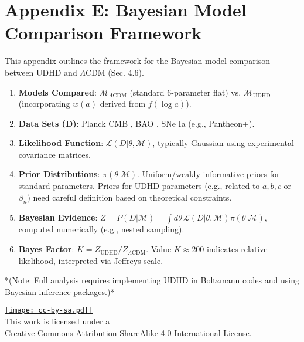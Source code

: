 \documentclass[12pt, a4paper]{article} %
\newcommand{\cclicense}{%
\begin{center}
\vspace{1em}
\footnotesize
\href{https://creativecommons.org/licenses/by-sa/4.0/}{\texttt{[image: cc-by-sa.pdf]}} \\ %
This work is licensed under a \\
\href{https://creativecommons.org/licenses/by-sa/4.0/}{Creative Commons Attribution-ShareAlike 4.0 International License}. \\
\vspace{1em}
\end{center}
}
\begin{document}
\section{Appendix E: Bayesian Model Comparison Framework}
\label{app:bayesian}
This appendix outlines the framework for the Bayesian model comparison between UDHD and \(\Lambda\)CDM (Sec. 4.6).
\begin{enumerate}
    \item \textbf{Models Compared}: \(\mathcal{M}_{\Lambda\text{CDM}}\) (standard 6-parameter flat) vs. \(\mathcal{M}_{\text{UDHD}}\) (incorporating \(w(a)\) derived from \(f(\log a)\)).
    \item \textbf{Data Sets (D)}: Planck CMB \cite{planck2020parameters}, BAO \cite{desi2024bao}, SNe Ia (e.g., Pantheon+).
    \item \textbf{Likelihood Function}: \( \mathcal{L}(D | \theta, \mathcal{M}) \), typically Gaussian using experimental covariance matrices.
    \item \textbf{Prior Distributions}: \( \pi(\theta | \mathcal{M}) \). Uniform/weakly informative priors for standard parameters. Priors for UDHD parameters (e.g., related to \(a,b,c\) or \( \beta_n \)) need careful definition based on theoretical constraints.
    \item \textbf{Bayesian Evidence}: \( Z = P(D | \mathcal{M}) = \int d\theta \, \mathcal{L}(D | \theta, \mathcal{M}) \pi(\theta | \mathcal{M}) \), computed numerically (e.g., nested sampling).
    \item \textbf{Bayes Factor}: \( K = Z_{\text{UDHD}} / Z_{\Lambda\text{CDM}} \). Value \( K \approx 200 \) indicates relative likelihood, interpreted via Jeffreys scale.
\end{enumerate}
*(Note: Full analysis requires implementing UDHD in Boltzmann codes and using Bayesian inference packages.)*


\cclicense
\end{document}
